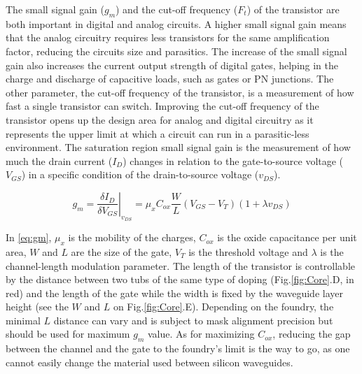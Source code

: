 
The small signal gain ($g_m$) and the cut-off frequency ($F_t$) of the transistor are both important in digital and analog circuits. 
A higher small signal gain means that the analog circuitry requires less transistors for the same amplification factor, reducing the circuits size and parasitics. 
The increase of the small signal gain also increases the current output strength of digital gates, helping in the charge and discharge of capacitive loads, such as gates or PN junctions. 
The other parameter, the cut-off frequency of the transistor, is a measurement of how fast a single transistor can switch.
Improving the cut-off frequency of the transistor opens up the design area for analog and digital circuitry as it represents the upper limit at which a circuit can run in a parasitic-less environment. 
The saturation region small signal gain is the measurement of how much the drain current ($I_D$) changes in relation to the gate-to-source voltage ($V_{GS}$) in a specific condition of the drain-to-source voltage ($v_{DS}$).

\begin{equation}
\label{eq:gm}
g_m = \left.\frac{\delta I_D}{\delta V_{GS}}\right|_{v_{DS}} = \mu_x C_{ox}\frac{W}{L}(V_{GS}-V_T)(1+\lambda v_{DS})
\end{equation}

In \ref{eq:gm}, $\mu_x$ is the mobility of the charges, $C_{ox}$ is the oxide capacitance per unit area, $W$ and $L$ are the size of the gate, $V_T$ is the threshold voltage and $\lambda$ is the channel-length modulation parameter. 
The length of the transistor is controllable by the distance between two tubs of the same type of doping (Fig.\ref{fig:Core}.D, in red) and the length of the gate while the width is fixed by the waveguide layer height (see the $W$ and $L$ on Fig.\ref{fig:Core}.E).
Depending on the foundry, the minimal $L$ distance can vary and is subject to mask alignment precision but should be used for maximum $g_m$ value. 
As for maximizing $C_{ox}$, reducing the gap between the channel and the gate to the foundry's limit is the way to go, as one cannot easily change the material used between silicon waveguides. 

